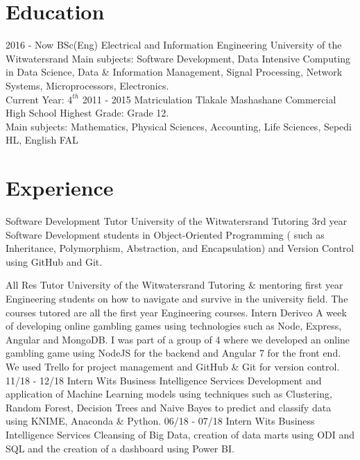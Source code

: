 \documentclass[]{friggeri-cv}
\DeclareRobustCommand{\hlcyan}[1]{{\sethlcolor{cyan}\hl{#1}}}
\begin{document}
\section{Education}
\begin{entrylist}
    \entry
    {2016 - Now}
    { BSc(Eng) Electrical and Information Engineering}
    {University of the Witwatersrand}
    {Main subjects: Software Development, Data Intensive Computing in Data Science, Data \& Information Management, Signal Processing, Network Systems, Microprocessors, Electronics.\\
    Current Year: $4^{th}$}
  \entry
    {2011 - 2015}
    {Matriculation}
    {Tlakale Mashashane Commercial High School }
    {Highest Grade: Grade 12.\\
    Main subjects: Mathematics, Physical Sciences, Accounting, Life Sciences, Sepedi HL, English FAL}
\end{entrylist}

\section{Experience}
\begin{entrylist}
        {Software Development Tutor}
        {University of the Witwatersrand}
        {Tutoring 3rd year Software Development students in Object-Oriented Programming ( such as Inheritance, Polymorphism, Abstraction, and Encapsulation) and Version Control using GitHub and Git. }

        {All Res Tutor}
        {University of the Witwatersrand}
        {Tutoring \& mentoring first year Engineering students on how to navigate and survive in the university field. The courses tutored are all the first year Engineering courses. }
        {Intern}
        {Derivco}
        {A week of developing online gambling games using technologies such as Node, Express, Angular and MongoDB. I was part of a group of 4 where we developed an online gambling game using NodeJS for the backend and Angular 7 for the front end. We used Trello for project management and GitHub \& Git for version control.}
  \entry
    {11/18 - 12/18}%
    {Intern}
    {Wits Business Intelligence Services}
    {Development and application of Machine Learning models using techniques such as Clustering, Random Forest, Decision Trees and Naive Bayes to predict and classify data using KNIME, Anaconda \& Python.}
  \entry
    {06/18 - 07/18}%
    {Intern}
    {Wits Business Intelligence Services}
    {Cleansing of Big Data, creation of data marts using ODI and SQL and the creation of a dashboard using Power BI.}
\end{entrylist}
\end{document}
